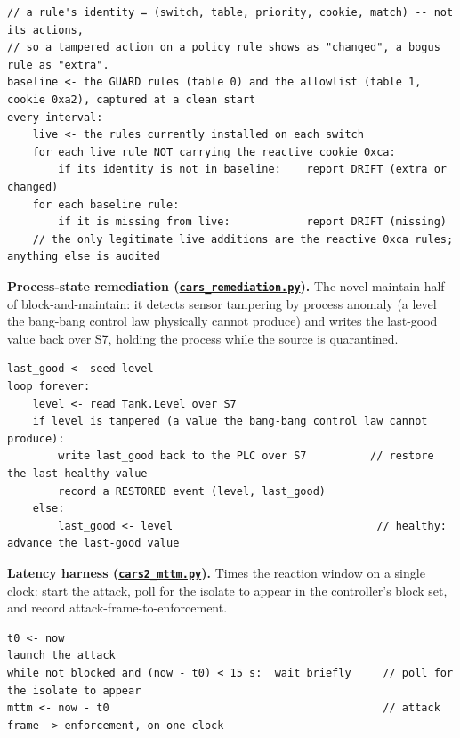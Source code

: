 \begin{lstlisting}[style=carspseudo,caption={Flow identity and the drift model, in pseudocode.},label={lst:flowaudit}]
// a rule's identity = (switch, table, priority, cookie, match) -- not its actions,
// so a tampered action on a policy rule shows as "changed", a bogus rule as "extra".
baseline <- the GUARD rules (table 0) and the allowlist (table 1, cookie 0xa2), captured at a clean start
every interval:
    live <- the rules currently installed on each switch
    for each live rule NOT carrying the reactive cookie 0xca:
        if its identity is not in baseline:    report DRIFT (extra or changed)
    for each baseline rule:
        if it is missing from live:            report DRIFT (missing)
    // the only legitimate live additions are the reactive 0xca rules; anything else is audited
\end{lstlisting}

\noindent \textbf{Process-state remediation (\href{\repourl/blob/main/06_Build/cars_remediation.py}{\texttt{cars\_remediation.py}}).} The novel maintain half of block-and-maintain: it detects sensor tampering by process anomaly (a level the bang-bang control law physically cannot produce) and writes the last-good value back over S7, holding the process while the source is quarantined.

\begin{lstlisting}[style=carspseudo,caption={Anomaly-triggered last-good restore over S7, in pseudocode.},label={lst:remediation}]
last_good <- seed level
loop forever:
    level <- read Tank.Level over S7
    if level is tampered (a value the bang-bang control law cannot produce):
        write last_good back to the PLC over S7          // restore the last healthy value
        record a RESTORED event (level, last_good)
    else:
        last_good <- level                                // healthy: advance the last-good value
\end{lstlisting}

\noindent \textbf{Latency harness (\href{\repourl/blob/main/07_Evaluation/cars2_mttm.py}{\texttt{cars2\_mttm.py}}).} Times the reaction window on a single clock: start the attack, poll for the isolate to appear in the controller's block set, and record attack-frame-to-enforcement.

\begin{lstlisting}[style=carspseudo,caption={Single-clock mean-time-to-mitigate measurement, in pseudocode.},label={lst:mttm}]
t0 <- now
launch the attack
while not blocked and (now - t0) < 15 s:  wait briefly     // poll for the isolate to appear
mttm <- now - t0                                           // attack frame -> enforcement, on one clock
\end{lstlisting}

